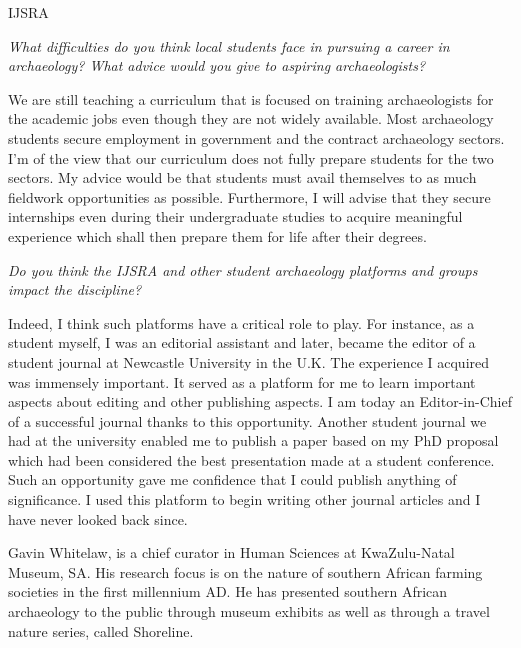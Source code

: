 \begin{labeling}{IJSRA}
\item[IJSRA] \emph{What difficulties do you think local students face in pursuing a career in archaeology? What advice would you give to aspiring archaeologists?}
	
\item[NN]
We are still teaching a curriculum that is focused on training archaeologists for the academic jobs even though they are not widely available. Most archaeology students secure employment in government and the contract archaeology sectors. I'm of the view that our curriculum does not fully prepare students for the two sectors. My advice would be that students must avail themselves to as much fieldwork opportunities as possible. Furthermore, I will advise that they secure internships even during their undergraduate studies to acquire meaningful experience which shall then prepare them for life after their degrees.

\item[IJSRA] \emph{Do you think the IJSRA and other student archaeology platforms and groups impact the discipline?}
	
\item[NN]
Indeed, I think such platforms have a critical role to play. For instance, as a student myself, I was an editorial assistant and later, became the editor of a student journal at Newcastle University in the U.K. The experience I acquired was immensely important. It served as a platform for me to learn important aspects about editing and other publishing aspects. I am today an Editor-in-Chief of a successful journal thanks to this opportunity. Another student journal we had at the university enabled me to publish a paper based on my PhD proposal which had been considered the best presentation made at a student conference. Such an opportunity gave me confidence that I could publish anything of significance. I used this platform to begin writing other journal articles and I have never looked back since.



\end{labeling}
\IJSRAseparator
{}
{\sffamily Gavin Whitelaw, is a chief curator in Human Sciences at KwaZulu-Natal Museum, SA. His research focus is on the nature of southern African farming societies in the first millennium AD. He has presented southern African archaeology to the public through museum exhibits as well as through a travel nature series, called Shoreline.}
